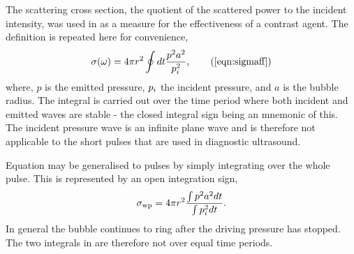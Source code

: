 The scattering cross section, the quotient  of the scattered power to the incident intensity,  was used in  %
as a measure for the effectiveness of a contrast agent.
%
%
The definition is repeated here for convenience,
\begin{align}
  \sigma(\omega) = 4\pi r^2 \oint dt \frac{ p^2  a^2}{\incp^2},\tag{\ref{eqn:sigmaff}}
\end{align}
where, $p$ is the emitted pressure, $p_i$  the incident  pressure, and $a$ is the bubble radius.
The integral is carried out over the
time period where both incident and emitted waves are stable - the closed integral sign being an mnemonic of this.
The incident pressure wave is an infinite plane wave and is therefore not applicable to the short pulses that are used in diagnostic ultrasound.

Equation  may be generalised to pulses by simply integrating over the whole pulse.
This is represented by an  open integration sign,
\begin{align}
  \sigma_\textrm{wp} = 4\pi r^2\frac{ \int p^2 a^2dt}{ \int p_i^2dt} \label{eqn:sigmaPulse}.
\end{align} 
In general the bubble continues to ring after the driving pressure has stopped.
The two integrals in  are therefore not  over equal time periods.



